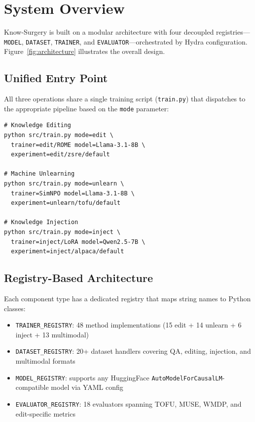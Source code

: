 \section{System Overview}
\label{sec:system}

Know-Surgery is built on a modular architecture with four decoupled registries---\texttt{MODEL}, \texttt{DATASET}, \texttt{TRAINER}, and \texttt{EVALUATOR}---orchestrated by Hydra configuration.
Figure~\ref{fig:architecture} illustrates the overall design.

\subsection{Unified Entry Point}

All three operations share a single training script (\texttt{train.py}) that dispatches to the appropriate pipeline based on the \texttt{mode} parameter:

\begin{lstlisting}
# Knowledge Editing
python src/train.py mode=edit \
  trainer=edit/ROME model=Llama-3.1-8B \
  experiment=edit/zsre/default

# Machine Unlearning
python src/train.py mode=unlearn \
  trainer=SimNPO model=Llama-3.1-8B \
  experiment=unlearn/tofu/default

# Knowledge Injection
python src/train.py mode=inject \
  trainer=inject/LoRA model=Qwen2.5-7B \
  experiment=inject/alpaca/default
\end{lstlisting}

\subsection{Registry-Based Architecture}

Each component type has a dedicated registry that maps string names to Python classes:

\begin{itemize}
\setlength\itemsep{0pt}
\item \texttt{TRAINER\_REGISTRY}: 48 method implementations (15 edit + 14 unlearn + 6 inject + 13 multimodal)
\item \texttt{DATASET\_REGISTRY}: 20+ dataset handlers covering QA, editing, injection, and multimodal formats
\item \texttt{MODEL\_REGISTRY}: supports any HuggingFace \texttt{AutoModelForCausalLM}-compatible model via YAML config
\item \texttt{EVALUATOR\_REGISTRY}: 18 evaluators spanning TOFU, MUSE, WMDP, and edit-specific metrics
\end{itemize}

